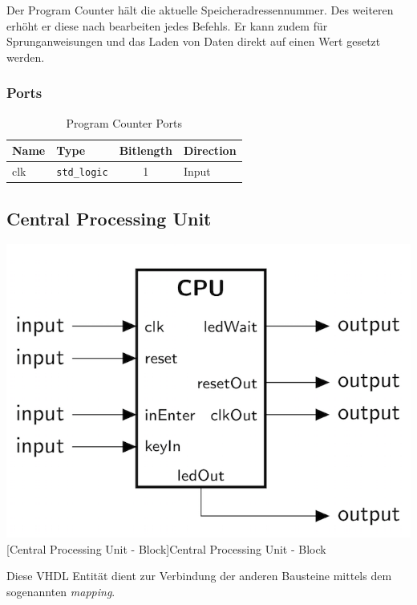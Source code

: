 Der Program Counter hält die aktuelle Speicheradressennummer. Des weiteren erhöht er diese nach bearbeiten jedes Befehls. Er kann zudem für Sprunganweisungen und das Laden von Daten direkt auf einen Wert gesetzt werden.

\subsubsection{Ports}

\vspace{1em}
\begin{table}[!h]
	\centering
	\begin{tabular}{|l|l|c|l|}
		\hline
		\textbf{Name} & \textbf{Type} & \textbf{Bitlength} & \textbf{Direction}\\
		\hline
		clk & \texttt{std\_logic} & 1 & Input \\
		\hline
	\end{tabular}
	\caption{Program Counter Ports}
	\label{tab:pc_ports}
\end{table}


\pagebreak
\subsection{Central Processing Unit}

\vspace{1em}
\begin{minipage}{\linewidth}
    \centering
    \includegraphics[width=0.4\linewidth]{images/CPU.png}\\
    [Central Processing Unit - Block]{Central Processing Unit - Block}
    \label{fig:cpu_block}
\end{minipage}

Diese VHDL Entität dient zur Verbindung der anderen Bausteine mittels dem sogenannten \emph{mapping}.

